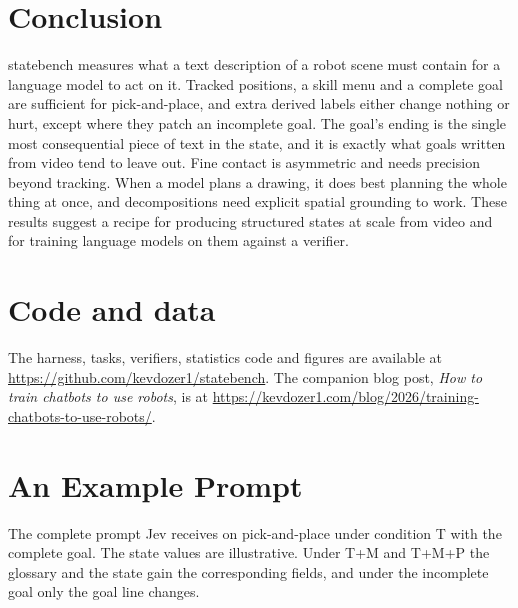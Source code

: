 \documentclass[11pt]{article}
\begin{document}
\section{Conclusion}

statebench measures what a text description of a robot scene must contain for a language model to act on it. Tracked positions, a skill menu and a complete goal are sufficient for pick-and-place, and extra derived labels either change nothing or hurt, except where they patch an incomplete goal. The goal's ending is the single most consequential piece of text in the state, and it is exactly what goals written from video tend to leave out. Fine contact is asymmetric and needs precision beyond tracking. When a model plans a drawing, it does best planning the whole thing at once, and decompositions need explicit spatial grounding to work. These results suggest a recipe for producing structured states at scale from video and for training language models on them against a verifier.

\section*{Code and data}

{\sloppy The harness, tasks, verifiers, statistics code and figures are available at \url{https://github.com/kevdozer1/statebench}. The companion blog post, \emph{How to train chatbots to use robots}, is at \url{https://kevdozer1.com/blog/2026/training-chatbots-to-use-robots/}.\par}
\appendix

\section{An Example Prompt}
\label{app:prompt}

The complete prompt Jev receives on pick-and-place under condition T with the complete goal. The state values are illustrative. Under T+M and T+M+P the glossary and the state gain the corresponding fields, and under the incomplete goal only the goal line changes.
\end{document}
